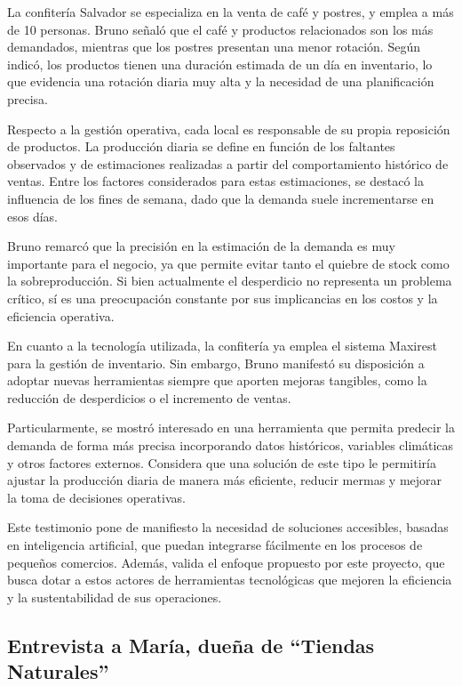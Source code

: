 La confitería Salvador se especializa en la venta de café y postres, y emplea a más de 10 personas. Bruno señaló que el café y productos relacionados son los más demandados, mientras que los postres presentan una menor rotación. Según indicó, los productos tienen una duración estimada de un día en inventario, lo que evidencia una rotación diaria muy alta y la necesidad de una planificación precisa.

Respecto a la gestión operativa, cada local es responsable de su propia reposición de productos. La producción diaria se define en función de los faltantes observados y de estimaciones realizadas a partir del comportamiento histórico de ventas. Entre los factores considerados para estas estimaciones, se destacó la influencia de los fines de semana, dado que la demanda suele incrementarse en esos días.

Bruno remarcó que la precisión en la estimación de la demanda es muy importante para el negocio, ya que permite evitar tanto el quiebre de stock como la sobreproducción. Si bien actualmente el desperdicio no representa un problema crítico, sí es una preocupación constante por sus implicancias en los costos y la eficiencia operativa.

En cuanto a la tecnología utilizada, la confitería ya emplea el sistema Maxirest para la gestión de inventario. Sin embargo, Bruno manifestó su disposición a adoptar nuevas herramientas siempre que aporten mejoras tangibles, como la reducción de desperdicios o el incremento de ventas.

Particularmente, se mostró interesado en una herramienta que permita predecir la demanda de forma más precisa incorporando datos históricos, variables climáticas y otros factores externos. Considera que una solución de este tipo le permitiría ajustar la producción diaria de manera más eficiente, reducir mermas y mejorar la toma de decisiones operativas.

Este testimonio pone de manifiesto la necesidad de soluciones accesibles, basadas en inteligencia artificial, que puedan integrarse fácilmente en los procesos de pequeños comercios. Además, valida el enfoque propuesto por este proyecto, que busca dotar a estos actores de herramientas tecnológicas que mejoren la eficiencia y la sustentabilidad de sus operaciones.


\subsection{Entrevista a María, dueña de ``Tiendas Naturales''}

